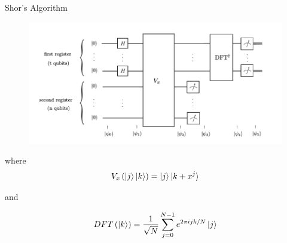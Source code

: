 \documentclass{beamer}
\begin{document}
\begin{frame}{Shor's Algorithm}

\begin{figure}[ht]
  \includegraphics[scale=0.4]{pasted5}
\end{figure}

where 
\[
V_x \left(\ket{j}\ket{k}\right) = \ket{j}\ket{k+x^j}
\]

and

\[
DFT\left(\ket{k}\right) = \frac{1}{\sqrt{N}}\sum_{j=0}^{N-1}e^{2\pi i j k/N}\ket{j}
\]
\end{frame}
\end{document}
